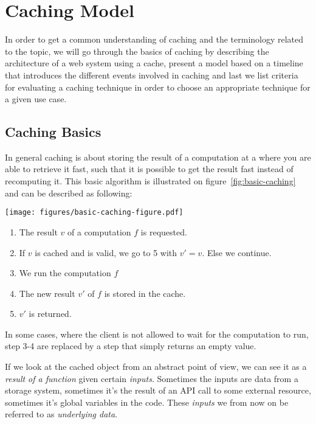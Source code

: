 \chapter{Caching Model}
\label{chapter:caching-model}

In order to get a common understanding of caching and the terminology related to the topic, we will go through the basics of caching by describing the architecture of a web system using a cache, present a model based on a timeline that introduces the different events involved in caching and last we list criteria for evaluating a caching technique in order to choose an appropriate technique for a given use case.

\section{Caching Basics}
\label{sec:caching_basics}

In general caching is about storing the result of a computation at a where you are able to retrieve it fast, such that it is possible to get the result fast instead of recomputing it. This basic algorithm is illustrated on figure~\ref{fig:basic-caching} and can be described as following:

\begin{figure*}[ht!]
  \centering
  \texttt{[image: figures/basic-caching-figure.pdf]}
  \begin{enumerate}
    \item The result $v$ of a computation $f$ is requested.
    \item If $v$ is cached and is valid, we go to 5 with $v'=v$. Else we continue.
    \item We run the computation $f$
    \item The new result $v'$ of $f$ is stored in the cache.
    \item $v'$ is returned.
  \end{enumerate}
  \caption{The flow of basic caching}
  \label{fig:basic-caching}
\end{figure*}

In some cases, where the client is not allowed to wait for the computation to run, step 3-4 are replaced by a step that simply returns an empty value.

If we look at the cached object from an abstract point of view, we can see it as a \emph{result of a function} given certain \emph{inputs}. Sometimes the inputs are data from a storage system, sometimes it's the result of an API call to some external resource, sometimes it's global variables in the code. These \emph{inputs} we from now on be referred to as \emph{underlying data}.

